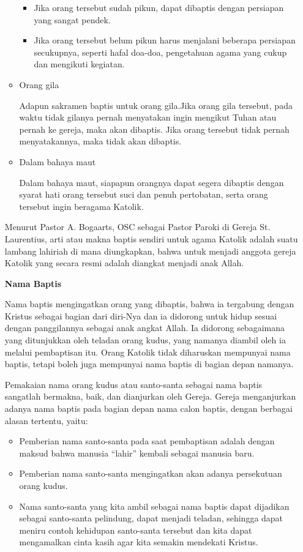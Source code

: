\documentclass[a4paper,twoside]{article}
\begin{document}
\begin{enumerate}
\begin{itemize}
		\begin{itemize}
			\item Jika orang tersebut sudah pikun, dapat dibaptis dengan persiapan yang sangat pendek.
			\item Jika orang tersebut belum pikun harus menjalani beberapa persiapan secukupnya, seperti hafal doa-doa, pengetahuan agama yang cukup dan mengikuti kegiatan.
		\end{itemize}
		
		\item Orang gila
		
		Adapun sakramen baptis untuk orang gila.Jika orang gila tersebut, pada waktu tidak gilanya pernah menyatakan ingin mengikut Tuhan atau pernah ke gereja, maka akan dibaptis. Jika orang tersebut tidak pernah menyatakannya, maka tidak akan dibaptis.
		\item Dalam bahaya maut
		
		Dalam bahaya maut, siapapun orangnya dapat segera dibaptis dengan syarat hati orang tersebut suci dan penuh pertobatan, serta orang tersebut ingin beragama Katolik.
		
	\end{itemize} 
	Menurut Pastor A. Bogaarts, OSC sebagai Pastor Paroki di Gereja St. Laurentius, arti atau makna baptis sendiri untuk agama Katolik adalah suatu lambang lahiriah di mana diungkapkan, bahwa untuk menjadi anggota gereja Katolik yang secara resmi adalah diangkat menjadi anak Allah.
	
\textbf{Nama Baptis}

	Nama baptis mengingatkan orang yang dibaptis, bahwa ia tergabung dengan Kristus sebagai bagian dari diri-Nya dan ia didorong untuk hidup sesuai dengan panggilannya sebagai anak angkat Allah. Ia didorong sebagaimana yang ditunjukkan oleh teladan orang kudus, yang namanya diambil oleh ia melalui pembaptisan itu. Orang Katolik tidak diharuskan mempunyai nama baptis, tetapi boleh juga mempunyai nama baptis di bagian depan namanya.
	
	Pemakaian nama orang kudus atau santo-santa sebagai nama baptis sangatlah bermakna, baik, dan dianjurkan oleh Gereja. Gereja menganjurkan adanya nama baptis pada bagian depan nama calon baptis, dengan berbagai alasan tertentu, yaitu:
	
	\begin{itemize}
		\item Pemberian nama santo-santa pada saat pembaptisan adalah dengan maksud bahwa manusia ``lahir'' kembali sebagai manusia baru.
		\item Pemberian nama santo-santa mengingatkan akan adanya persekutuan orang kudus.
		\item Nama santo-santa yang kita ambil sebagai nama baptis dapat dijadikan sebagai santo-santa pelindung, dapat menjadi teladan, sehingga dapat meniru contoh kehidupan santo-santa tersebut dan kita dapat mengamalkan cinta kasih agar kita semakin mendekati Kristus.
	\end{itemize}
	

\end{enumerate}
\end{document}
